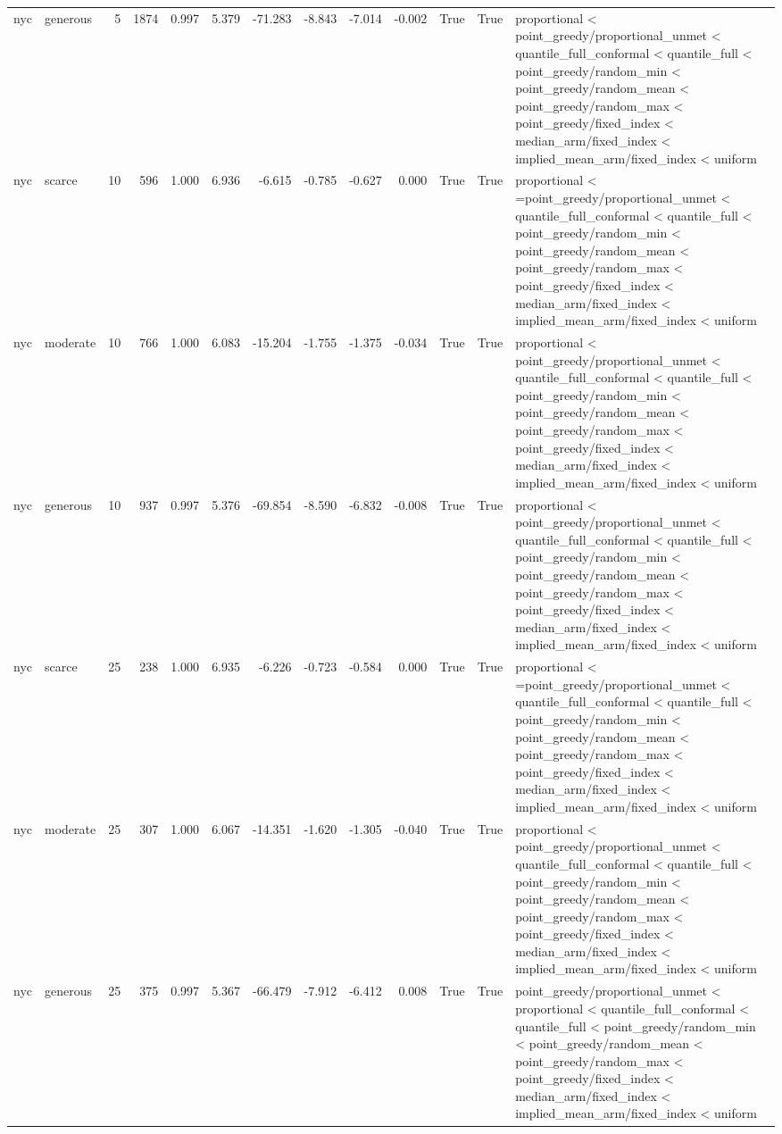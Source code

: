 \begin{tabular}{llrrrrrrrrrrl}
nyc & generous & 5 & 1874 & 0.997 & 5.379 & -71.283 & -8.843 & -7.014 & -0.002 & True & True & proportional < point\_greedy/proportional\_unmet < quantile\_full\_conformal < quantile\_full < point\_greedy/random\_min < point\_greedy/random\_mean < point\_greedy/random\_max < point\_greedy/fixed\_index < median\_arm/fixed\_index < implied\_mean\_arm/fixed\_index < uniform \\
nyc & scarce & 10 & 596 & 1.000 & 6.936 & -6.615 & -0.785 & -0.627 & 0.000 & True & True & proportional < =point\_greedy/proportional\_unmet < quantile\_full\_conformal < quantile\_full < point\_greedy/random\_min < point\_greedy/random\_mean < point\_greedy/random\_max < point\_greedy/fixed\_index < median\_arm/fixed\_index < implied\_mean\_arm/fixed\_index < uniform \\
nyc & moderate & 10 & 766 & 1.000 & 6.083 & -15.204 & -1.755 & -1.375 & -0.034 & True & True & proportional < point\_greedy/proportional\_unmet < quantile\_full\_conformal < quantile\_full < point\_greedy/random\_min < point\_greedy/random\_mean < point\_greedy/random\_max < point\_greedy/fixed\_index < median\_arm/fixed\_index < implied\_mean\_arm/fixed\_index < uniform \\
nyc & generous & 10 & 937 & 0.997 & 5.376 & -69.854 & -8.590 & -6.832 & -0.008 & True & True & proportional < point\_greedy/proportional\_unmet < quantile\_full\_conformal < quantile\_full < point\_greedy/random\_min < point\_greedy/random\_mean < point\_greedy/random\_max < point\_greedy/fixed\_index < median\_arm/fixed\_index < implied\_mean\_arm/fixed\_index < uniform \\
nyc & scarce & 25 & 238 & 1.000 & 6.935 & -6.226 & -0.723 & -0.584 & 0.000 & True & True & proportional < =point\_greedy/proportional\_unmet < quantile\_full\_conformal < quantile\_full < point\_greedy/random\_min < point\_greedy/random\_mean < point\_greedy/random\_max < point\_greedy/fixed\_index < median\_arm/fixed\_index < implied\_mean\_arm/fixed\_index < uniform \\
nyc & moderate & 25 & 307 & 1.000 & 6.067 & -14.351 & -1.620 & -1.305 & -0.040 & True & True & proportional < point\_greedy/proportional\_unmet < quantile\_full\_conformal < quantile\_full < point\_greedy/random\_min < point\_greedy/random\_mean < point\_greedy/random\_max < point\_greedy/fixed\_index < median\_arm/fixed\_index < implied\_mean\_arm/fixed\_index < uniform \\
nyc & generous & 25 & 375 & 0.997 & 5.367 & -66.479 & -7.912 & -6.412 & 0.008 & True & True & point\_greedy/proportional\_unmet < proportional < quantile\_full\_conformal < quantile\_full < point\_greedy/random\_min < point\_greedy/random\_mean < point\_greedy/random\_max < point\_greedy/fixed\_index < median\_arm/fixed\_index < implied\_mean\_arm/fixed\_index < uniform \\

\end{tabular}
